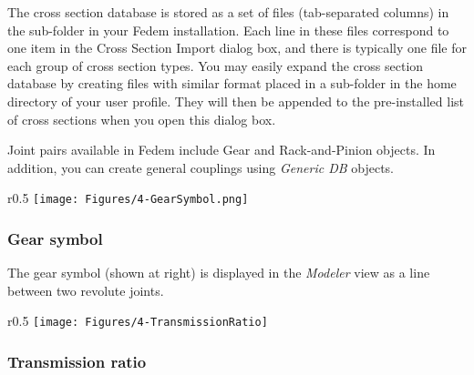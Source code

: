 The cross section database is stored as a set of  files
(tab-separated columns) in the  sub-folder
in your Fedem installation. Each line in these files correspond to one
item in the Cross Section Import dialog box, and there is typically one
file for each group of cross section types. You may easily expand the
cross section database by creating files with similar format placed in a
 sub-folder in the home directory of your user profile.
They will then be appended to the pre-installed list of cross sections
when you open this dialog box.





\clearpage

Joint pairs available in Fedem include Gear and Rack-and-Pinion objects.
In addition, you can create general couplings using {\sl Generic DB} objects.




\begin{wrapfigure}{r}{0.5\textwidth}
  \vspace{-5mm}
  \texttt{[image: Figures/4-GearSymbol.png]}
\end{wrapfigure}

\subsubsection{Gear symbol}

The gear symbol (shown at right) is displayed in the {\sl Modeler} view
as a line between two revolute joints.

\begin{wrapfigure}{r}{0.5\textwidth}
  \texttt{[image: Figures/4-TransmissionRatio]}
\end{wrapfigure}

\subsubsection{Transmission ratio}

